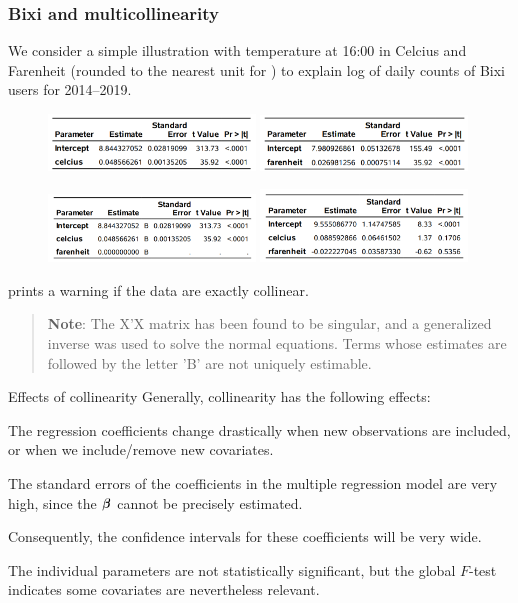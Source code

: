 \documentclass{beamer}
\begin{document}
\begin{frame}[fragile]
 \frametitle{Bixi and multicollinearity}
 We consider a simple illustration with temperature at 16:00 in Celcius and Farenheit (rounded to the nearest unit for ) to explain log of daily counts of Bixi users for 2014--2019. 
    \begin{figure}[ht!]
 \centering 
  \includegraphics[width = 0.49\textwidth]{img/c2/slides3-e20} 
  \includegraphics[width = 0.49\textwidth]{img/c2/slides3-e21}
 \end{figure}
 
   \begin{figure}[ht!]
 \centering 
  \includegraphics[width = 0.49\textwidth]{img/c2/slides3-e22} 
  \includegraphics[width = 0.49\textwidth]{img/c2/slides3-e23}
 \end{figure}
 {\footnotesize \SASlang prints a warning if the data are exactly collinear.
 \begin{quote}
 \textbf{Note}: The X'X matrix has been found to be singular, and a generalized inverse was used to solve the normal equations. Terms whose estimates are followed by the letter 'B' are not uniquely estimable.
 \end{quote}
 
 }


\end{frame}

\begin{frame}{Effects of collinearity}
Generally, collinearity has the following effects:
\bi
\item The regression coefficients change drastically when new observations are included, or when we include/remove new covariates.
\item The standard errors of the coefficients in the multiple regression model are very high, since the $\boldsymbol {\beta}$ cannot be precisely estimated.
\item Consequently, the confidence intervals for these coefficients will be very wide.
\item The individual parameters are not statistically significant, but the global $F$-test indicates some covariates are nevertheless relevant.
\ei
\end{frame}
\end{document}

